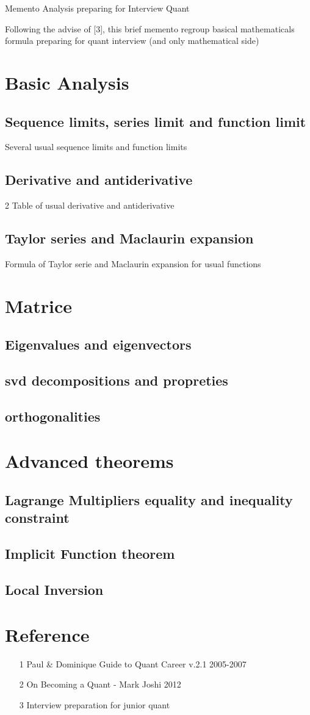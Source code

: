 \documentclass[a4paper,10pt]{article}
\begin{document}
\begin{center}Memento Analysis preparing for Interview Quant\end{center}
Following the advise of [3], this brief memento regroup basical mathematicals formula preparing for quant interview (and only mathematical side)
\section{Basic Analysis}
\subsection{Sequence limits, series limit and function limit}
Several usual sequence limits and function limits
\subsection{Derivative and antiderivative}
2 Table of usual derivative and antiderivative
\subsection{Taylor series and Maclaurin expansion}
Formula of Taylor serie and Maclaurin expansion for usual functions
\section{Matrice}
\subsection{Eigenvalues and eigenvectors}
\subsection{svd decompositions and propreties}
\subsection{orthogonalities}
\section{Advanced theorems}
\subsection{Lagrange Multipliers equality and inequality constraint}
\subsection{Implicit Function theorem}
\subsection{Local Inversion}

\section{Reference}
\begin{itemize}
 \item [1] Paul \& Dominique Guide to Quant Career v.2.1 2005-2007
 \item [2] On Becoming a Quant - Mark Joshi 2012
 \item [3] Interview preparation for junior quant
 \end{itemize}
\end{document}
